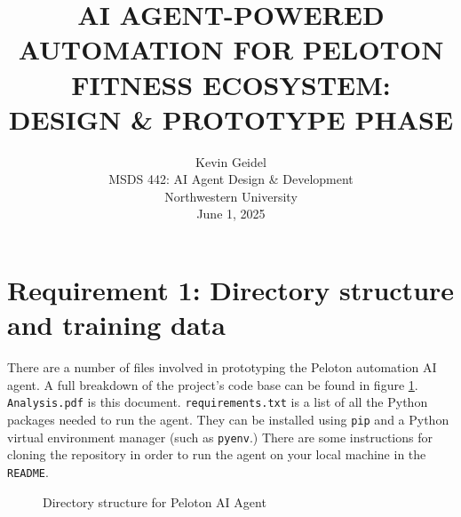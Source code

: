 \documentclass[11pt,letterpaper]{article}
\begin{document}
\selectfont
{}
\doublespacing
\setlength{\droptitle}{1in} 

\title{\large{AI AGENT-POWERED AUTOMATION FOR PELOTON FITNESS ECOSYSTEM: \\ DESIGN \& PROTOTYPE PHASE \\\vspace{1.2in}}}

\author{
Kevin Geidel \\
MSDS 442: AI Agent Design \& Development \\
Northwestern University \\
June 1, 2025 \\
}

\date{}
\maketitle
\thispagestyle{empty}	
\clearpage
\setcounter{page}{1}

\section*{Requirement 1: Directory structure and training data}
\tab There are a number of files involved in prototyping the Peloton automation AI agent.
A full breakdown of the project's code base can be found in figure \ref{fig:dirtree}. \texttt{Analysis.pdf} is this document. \texttt{requirements.txt} is a list of all the Python packages needed to run the agent. They can be installed using \texttt{pip} and a Python virtual environment manager (such as \texttt{pyenv}.) There are some instructions for cloning the repository in order to run the agent on your local machine in the \texttt{README}.

\begin{figure}[h!]
    \centering
    \begin{minipage}{0.9\linewidth}
    \end{minipage}
    \caption{Directory structure for Peloton AI Agent}
    \label{fig:dirtree}
\end{figure}
\end{document}
